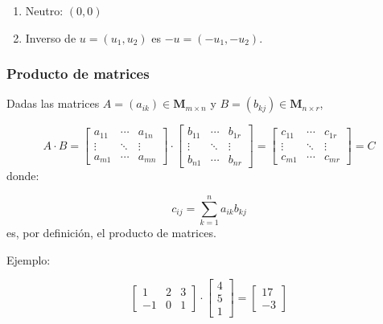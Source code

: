 \begin{enumerate}[label=\roman*)]
	\item Neutro: $(0,0)$
	\item Inverso de $u = (u_1, u_2)$ es $-u = (-u_1, -u_2)$.
\end{enumerate}

\subsubsection{Producto de matrices}
Dadas las matrices $A = (a_{ik}) \in \mathbf{M}_{m\times n}$ y $B = (b_{kj}) \in \mathbf{M}_{n\times r}$,

\begin{equation}
	A \cdot B = 
	\begin{bmatrix}
		a_{11} & \cdots & a_{1n}\\
		\vdots & \ddots & \vdots\\
		a_{m1} & \cdots & a_{mn}
	\end{bmatrix} \cdot \begin{bmatrix}
		b_{11} & \cdots & b_{1r}\\
		\vdots & \ddots & \vdots\\
		b_{n1} & \cdots & b_{nr}
	\end{bmatrix} = \begin{bmatrix}
		c_{11} & \cdots & c_{1r}\\
		\vdots & \ddots & \vdots\\
		c_{m1} & \cdots & c_{mr}
	\end{bmatrix} = C
\end{equation}
donde:

\begin{equation}
	c_{ij} = \sum_{k=1}^{n} a_{ik} b_{kj}
	\label{eq:cij}
\end{equation}
es, por definición, el producto de matrices.

Ejemplo:

\[ \begin{bmatrix}
	1 & 2 & 3\\
	-1 & 0 & 1
\end{bmatrix} \cdot \begin{bmatrix}
	4 \\ 5 \\ 1
\end{bmatrix} = \begin{bmatrix}
	17 \\ -3
\end{bmatrix} \]

